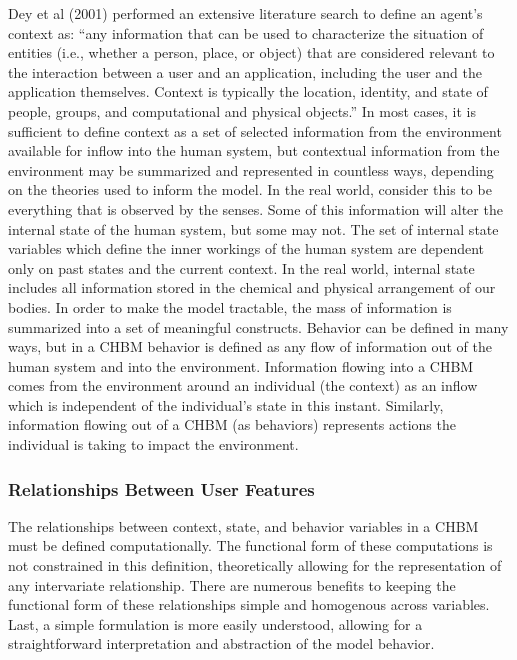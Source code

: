 \documentclass[runningheads,a4paper]{llncs}
\begin{document}
Dey et al (2001) performed an extensive literature search to define an agent’s context as: “any information that can be used to characterize the situation of entities (i.e., whether a person, place, or object) that are considered relevant to the interaction between a user and an application, including the user and the application themselves. Context is typically the location, identity, and state of people, groups, and computational and physical objects.” 
In most cases, it is sufficient to define context as a set of selected information from the environment available for inflow into the human system, but contextual information from the environment may be summarized and represented in countless ways, depending on the theories used to inform the model.
In the real world, consider this to be everything that is observed by the senses. 
Some of this information will alter the internal state of the human system, but some may not. 
The set of internal state variables which define the inner workings of the human system are dependent only on past states and the current context. 
In the real world, internal state includes all information stored in the chemical and physical  arrangement of our bodies. 
In order to make the model tractable, the mass of information is summarized into a set of meaningful constructs.
Behavior can be defined in many ways, but in a CHBM behavior is defined as any flow of information out of the human system and into the environment.
Information flowing into a CHBM comes from the environment around an individual (the context) as an inflow which is independent of the individual’s state in this instant.
Similarly, information flowing out of a CHBM (as behaviors) represents actions the individual is taking to impact the environment.

\subsubsection{Relationships Between User Features}
The relationships between context, state, and behavior variables in a CHBM must be defined computationally.
The functional form of these computations is not constrained in this definition, theoretically allowing for the representation of any intervariate relationship.
There are numerous benefits to keeping the functional form of these relationships simple and homogenous across variables.
Last, a simple formulation is more easily understood, allowing for a straightforward interpretation and abstraction of the model behavior.
\end{document}

